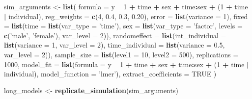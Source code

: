 \documentclass[man,mask,floatsintext]{apa6}
\newenvironment{Shaded}{\begin{snugshade}}{\end{snugshade}}
\newcommand{\DataTypeTok}[1]{\textcolor[rgb]{0.13,0.29,0.53}{#1}}
\newcommand{\DecValTok}[1]{\textcolor[rgb]{0.00,0.00,0.81}{#1}}
\newcommand{\FloatTok}[1]{\textcolor[rgb]{0.00,0.00,0.81}{#1}}
\newcommand{\KeywordTok}[1]{\textcolor[rgb]{0.13,0.29,0.53}{\textbf{#1}}}
\newcommand{\NormalTok}[1]{#1}
\newcommand{\OperatorTok}[1]{\textcolor[rgb]{0.81,0.36,0.00}{\textbf{#1}}}
\newcommand{\OtherTok}[1]{\textcolor[rgb]{0.56,0.35,0.01}{#1}}
\newcommand{\StringTok}[1]{\textcolor[rgb]{0.31,0.60,0.02}{#1}}
\begin{document}
\begin{Shaded}
\begin{Highlighting}[]
\NormalTok{sim_arguments <-}\StringTok{ }\KeywordTok{list}\NormalTok{(}
  \DataTypeTok{formula =}\NormalTok{ y }\OperatorTok{~}\StringTok{ }\DecValTok{1} \OperatorTok{+}\StringTok{ }\NormalTok{time }\OperatorTok{+}\StringTok{ }\NormalTok{sex }\OperatorTok{+}\StringTok{ }\NormalTok{time}\OperatorTok{:}\NormalTok{sex }\OperatorTok{+}\StringTok{ }\NormalTok{(}\DecValTok{1} \OperatorTok{+}\StringTok{ }\NormalTok{time }\OperatorTok{|}\StringTok{ }\NormalTok{individual),}
  \DataTypeTok{reg_weights =} \KeywordTok{c}\NormalTok{(}\DecValTok{4}\NormalTok{, }\FloatTok{0.4}\NormalTok{, }\FloatTok{0.3}\NormalTok{, }\FloatTok{0.20}\NormalTok{),}
  \DataTypeTok{error =} \KeywordTok{list}\NormalTok{(}\DataTypeTok{variance =} \DecValTok{1}\NormalTok{),}
  \DataTypeTok{fixed =} \KeywordTok{list}\NormalTok{(}\DataTypeTok{time =} \KeywordTok{list}\NormalTok{(}\DataTypeTok{var_type =} \StringTok{'time'}\NormalTok{),}
               \DataTypeTok{sex =} \KeywordTok{list}\NormalTok{(}\DataTypeTok{var_type =} \StringTok{'factor'}\NormalTok{, }\DataTypeTok{levels =} \KeywordTok{c}\NormalTok{(}\StringTok{'male'}\NormalTok{, }\StringTok{'female'}\NormalTok{),}
                          \DataTypeTok{var_level =} \DecValTok{2}\NormalTok{)),}
  \DataTypeTok{randomeffect =} \KeywordTok{list}\NormalTok{(}\DataTypeTok{int_individual =} \KeywordTok{list}\NormalTok{(}\DataTypeTok{variance =} \DecValTok{1}\NormalTok{, }\DataTypeTok{var_level =} \DecValTok{2}\NormalTok{),}
                      \DataTypeTok{time_individual =} \KeywordTok{list}\NormalTok{(}\DataTypeTok{variance =} \FloatTok{0.5}\NormalTok{, }\DataTypeTok{var_level =} \DecValTok{2}\NormalTok{)),}
  \DataTypeTok{sample_size =} \KeywordTok{list}\NormalTok{(}\DataTypeTok{level1 =} \DecValTok{10}\NormalTok{, }\DataTypeTok{level2 =} \DecValTok{500}\NormalTok{),}
  \DataTypeTok{replications =} \DecValTok{1000}\NormalTok{,}
  \DataTypeTok{model_fit =} \KeywordTok{list}\NormalTok{(}\DataTypeTok{formula =}\NormalTok{ y }\OperatorTok{~}\StringTok{ }\DecValTok{1} \OperatorTok{+}\StringTok{ }\NormalTok{time }\OperatorTok{+}\StringTok{ }\NormalTok{sex }\OperatorTok{+}\StringTok{ }\NormalTok{time}\OperatorTok{:}\NormalTok{sex }\OperatorTok{+}\StringTok{ }
\StringTok{                     }\NormalTok{(}\DecValTok{1} \OperatorTok{+}\StringTok{ }\NormalTok{time }\OperatorTok{|}\StringTok{ }\NormalTok{individual), }
                   \DataTypeTok{model_function =} \StringTok{'lmer'}\NormalTok{),}
  \DataTypeTok{extract_coefficients =} \OtherTok{TRUE}
\NormalTok{)}

\NormalTok{long_models <-}\StringTok{ }\KeywordTok{replicate_simulation}\NormalTok{(sim_arguments)}
\end{Highlighting}
\end{Shaded}
\end{document}
